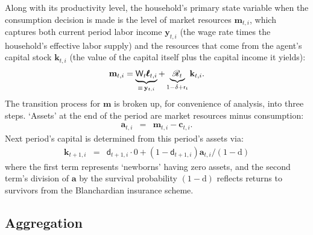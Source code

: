 \documentclass[titlepage]{./econtex}
\begin{document}
Along with its productivity level, the household's primary state variable when the consumption decision is made is the level of market resources $\mathbf{m}_{t,i}$, which captures both current period labor income $\mathbf{y}_{t,i}$ (the wage rate times the household's effective labor supply) and the resources that come from the agent's capital stock $\mathbf{k}_{t,i}$ (the value of the capital itself plus the capital income it yields):
\begin{equation}
  \mathbf{m}_{t,i} = \underbrace{{\bf \mathsf{W}}_{t} \pmb{\ell}_{t,i}}_{\equiv\,\mathbf{y}_{t,i}} + \underbrace{{\mathscr{R}}_t}_{1-\delta+\mathsf{r}_{t}} \mathbf{k}_{t,i}.
\label{eq:mDef}
\end{equation}
 The transition process for $\mathbf{m}$ is broken up, for convenience
of analysis, into three steps.  `Assets' at the end of the period are
market resources minus consumption:
\begin{eqnarray}
   \mathbf{a}_{t,i} & = & \mathbf{m}_{t,i}-\mathbf{c}_{t,i}. \label{eq:aDef}
\end{eqnarray}
 Next period's capital is determined from this period's assets via:
\begin{eqnarray}
\mathbf{k}_{t+1,i} & = & \mathsf{d}_{t+1,i} \cdot 0+ (1 - \mathsf{d}_{t+1,i})\mathbf{a}_{t,i} \big/(1-\mathrm{d}) \label{eq:ktp1icompact}
\end{eqnarray}
where the first term represents `newborns' having zero assets, and the second term's division of $\mathbf{a}$ by the survival probability $(1-\mathrm{d})$ reflects returns to survivors from the Blanchardian insurance scheme.


\subsection{Aggregation}
\end{document}
